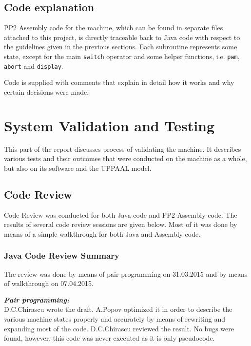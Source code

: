 \documentclass[a4paper,oneside,11pt]{report}
\begin{document}
\section{Code explanation}
PP2 Assembly code for the machine, which can be found in separate files attached to this project, is directly traceable back to Java code with respect to the guidelines given in the previous sections. Each subroutine represents some state, except for the main \texttt{switch} operator and some helper functions, i.e. \texttt{pwm}, \texttt{abort} and \texttt{display}.

Code is supplied with comments that explain in detail how it works and why certain decisions were made.

\chapter{System Validation and Testing}
This part of the report discusses process of validating the machine. It describes various tests and their outcomes that were conducted on the machine as a whole, but also on its software and the UPPAAL model.

\section{Code Review}
Code Review was conducted for both Java code and PP2 Assembly code. The results of several code review sessions are given below. Most of it was done by means of a simple walkthrough for both Java and Assembly code.

\subsection{Java Code Review Summary}
The review was done by means of pair programming on 31.03.2015 and by means of walkthrough on 07.04.2015.

\textbf{\textit{Pair programming:}}\\
D.C.Chirascu wrote the draft. A.Popov optimized it in order to describe the various machine states properly and accurately by means of rewriting and expanding most of the code. D.C.Chirascu reviewed the result. No bugs were found, however, this code was never executed as it is only pseudocode.
\end{document}
